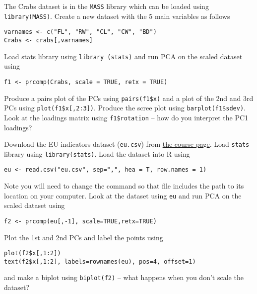 \documentclass[answers]{exam}
\begin{document}
\begin{questions}
\question%
The Crabs dataset is in the \texttt{MASS} library which can be loaded using \verb|library(MASS)|. Create a new dataset with the 5 main variables as follows
\begin{verbatim}
varnames <- c("FL", "RW", "CL", "CW", "BD")
Crabs <- crabs[,varnames]
\end{verbatim} Load stats library using \verb|library (stats)| and run PCA on the scaled dataset using \begin{verbatim}
f1 <- prcomp(Crabs, scale = TRUE, retx = TRUE)
\end{verbatim} Produce a pairs plot of the PCs using \verb|pairs(f1$x)| and a plot of the 2nd and 3rd PCs using \verb|plot(f1$x[,2:3])|. Produce the scree plot using \verb|barplot(f1$sdev)|. Look at the loadings matrix using \verb|f1$rotation| -- how do you interpret the PC1 loadings?



\question%
Download the EU indicators dataset (\texttt{eu.csv}) from \href{https://courses.maths.ox.ac.uk/course/view.php?id=620}{the course page}. Load \texttt{stats} library using \verb|library(stats)|. Load the dataset into R using \begin{verbatim}
eu <- read.csv("eu.csv", sep=",", hea = T, row.names = 1)
\end{verbatim} Note you will need to change the command so that file includes the path to its location on your computer. Look at the dataset using \verb|eu| and run PCA on the scaled dataset using \begin{verbatim}
f2 <- prcomp(eu[,-1], scale=TRUE,retx=TRUE)
\end{verbatim} Plot the 1st and 2nd PCs and label the points using \begin{verbatim}
plot(f2$x[,1:2])
text(f2$x[,1:2], labels=rownames(eu), pos=4, offset=1)
\end{verbatim} and make a biplot using \verb|biplot(f2)| -- what happens when you don't scale the dataset?

\end{questions}
\end{document}

